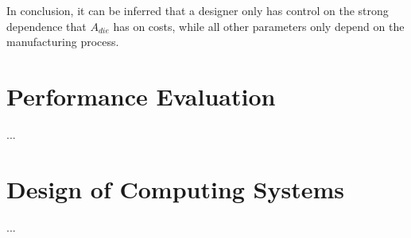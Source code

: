 In conclusion, it can be inferred that a designer only has control on the strong dependence that $A_{die}$ has on costs, while all other parameters only depend on the manufacturing process.


\section{Performance Evaluation}
...

\section{Design of Computing Systems}
...


